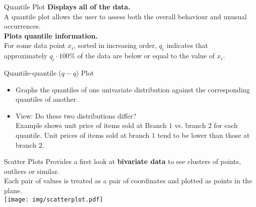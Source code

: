 \begin{frame}{Quantile Plot}
	\textbf{Displays all of the data.}\\
	A quantile plot allows the user to assess both the overall behaviour and unusual occurrences.\\[0.5cm]
	\textbf{Plots quantile information.}\\
	For some data point $x_i$, sorted in increasing order, $q_i$ indicates that approximately $q_i \cdot 100 \%$ of the data are below or equal to the value of $x_i$.\\[0.2cm]
	\centering
\end{frame}

\begin{frame}{Quantile-quantile ($q-q$) Plot}
	\begin{itemize}
		\item Graphs the quantiles of one univariate distribution against the corresponding quantiles of another.
		\item View: Do these two distributions differ?\\
		      Example shows unit price of items sold at Branch $1$ vs. branch $2$ for each quantile.  Unit prices of items sold at branch $1$ tend to be lower than those at branch $2$.
	\end{itemize}\vspace{0.5cm}
	\centering
\end{frame}

\begin{frame}{Scatter Plots}
	Provides a first look at \textbf{bivariate data} to see clusters of points, outliers or similar.\\
	Each pair of values is treated as a pair of coordinates and plotted as points in the plane.\\[0.5cm]
	\centering
	\texttt{[image: img/scatterplot.pdf]}
\end{frame}

